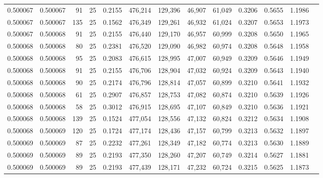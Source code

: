 \begin{tabular}{rrrrrrrrrrrrr}
0.500067 & 0.500067 &    91 &  25 &                                     0.2155 & 476,214 & 129,396 &  46,907 &  61,049 & 0.3206 & 0.5655 & 1.1986 \\
0.500067 & 0.500067 &   135 &  25 &                                     0.1562 & 476,349 & 129,261 &  46,932 &  61,024 & 0.3207 & 0.5653 & 1.1973 \\
0.500067 & 0.500068 &    91 &  25 &                                     0.2155 & 476,440 & 129,170 &  46,957 &  60,999 & 0.3208 & 0.5650 & 1.1965 \\
0.500068 & 0.500068 &    80 &  25 &                                     0.2381 & 476,520 & 129,090 &  46,982 &  60,974 & 0.3208 & 0.5648 & 1.1958 \\
0.500068 & 0.500068 &    95 &  25 &                                     0.2083 & 476,615 & 128,995 &  47,007 &  60,949 & 0.3209 & 0.5646 & 1.1949 \\
0.500068 & 0.500068 &    91 &  25 &                                     0.2155 & 476,706 & 128,904 &  47,032 &  60,924 & 0.3209 & 0.5643 & 1.1940 \\
0.500068 & 0.500068 &    90 &  25 &                                     0.2174 & 476,796 & 128,814 &  47,057 &  60,899 & 0.3210 & 0.5641 & 1.1932 \\
0.500068 & 0.500068 &    61 &  25 &                                     0.2907 & 476,857 & 128,753 &  47,082 &  60,874 & 0.3210 & 0.5639 & 1.1926 \\
0.500068 & 0.500068 &    58 &  25 &                                     0.3012 & 476,915 & 128,695 &  47,107 &  60,849 & 0.3210 & 0.5636 & 1.1921 \\
0.500068 & 0.500068 &   139 &  25 &                                     0.1524 & 477,054 & 128,556 &  47,132 &  60,824 & 0.3212 & 0.5634 & 1.1908 \\
0.500068 & 0.500069 &   120 &  25 &                                     0.1724 & 477,174 & 128,436 &  47,157 &  60,799 & 0.3213 & 0.5632 & 1.1897 \\
0.500069 & 0.500069 &    87 &  25 &                                     0.2232 & 477,261 & 128,349 &  47,182 &  60,774 & 0.3213 & 0.5630 & 1.1889 \\
0.500069 & 0.500069 &    89 &  25 &                                     0.2193 & 477,350 & 128,260 &  47,207 &  60,749 & 0.3214 & 0.5627 & 1.1881 \\
0.500069 & 0.500069 &    89 &  25 &                                     0.2193 & 477,439 & 128,171 &  47,232 &  60,724 & 0.3215 & 0.5625 & 1.1873 \\

\end{tabular}
